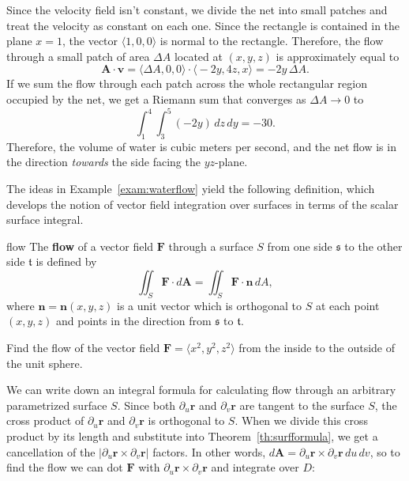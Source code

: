 \documentclass[indent]{watsonbook}
\begin{document}
\begin{solution}
  Since the velocity field isn't constant, we divide the net into
  small patches and treat the velocity as constant on each one. Since
  the rectangle is contained in the plane $x=1$, the vector
  $\langle 1, 0, 0 \rangle$ is normal to the rectangle. Therefore, the flow
  through a small patch of area $\Delta A$ located at $(x,y,z)$ is
  approximately equal to
  \[
    \mathbf{A} \cdot \mathbf{v} = \big\langle \Delta A, 0, 0 \big\rangle \cdot
    \big\langle -2y, 4z, x \big\rangle = -2y \, \Delta A.
  \]
  If we sum the flow through each patch across the whole rectangular
  region occupied by the net, we get a Riemann sum that converges as
  $\Delta A \to 0$ to
  \[
    \int_1^4 \int_3^5 (-2y) \, {d} z \, {d} y = -30.
  \]
  Therefore, the volume of water is  cubic meters per
  second, and the net flow is in the direction \textit{towards} the
  side facing the $yz$-plane.
\end{solution}

The ideas in Example~\ref{exam:waterflow} yield the following
definition, which develops the notion of vector field integration over
surfaces in terms of the scalar surface
integral.

\begin{defn}{}{flow}
  The \textbf{flow} of a vector field $\mathbf{F}$ through a surface
  $S$ from one side $\mathfrak{s}$ to the other side $\mathfrak{t}$ is defined by
  \[
    \iint_S \mathbf{F} \cdot {d}\mathbf{A} =  \iint_S \mathbf{F} \cdot \mathbf{n}
    \, {{d}}A,
  \]
  where $\mathbf{n}=\mathbf{n}(x,y,z)$ is a unit vector which is
  orthogonal to $S$ at each point $(x,y,z)$ and points in the
  direction from $\mathfrak{s}$ to $\mathfrak{t}$.
\end{defn}

\begin{exercise}{}{}
  Find the flow of the vector field $\mathbf{F} = \langle x^2, y^2, z^2 \rangle$
  from the inside to the outside of the unit sphere.
\end{exercise}

We can write down an integral formula for calculating flow through an
arbitrary parametrized surface $S$. Since both $\partial_u \mathbf{r}$
and $\partial_v \mathbf{r}$ are tangent to the surface $S$, the cross
product of $\partial_u \mathbf{r} $ and $\partial_v \mathbf{r}$ is
orthogonal to $S$. When we divide this cross product by its length and
substitute into Theorem~\ref{th:surfformula}, we get a cancellation of
the $|\partial_u \mathbf{r} \times \partial_v \mathbf{r}|$ factors. In
other words,
${d}\mathbf{A} = \partial_u \mathbf{r} \times \partial_v \mathbf{r} \,
{d} u \, {d} v$, so to find the flow we can dot $\mathbf{F}$ with
$\partial_u \mathbf{r} \times \partial_v \mathbf{r}$ and integrate
over $D$:
\end{document}
